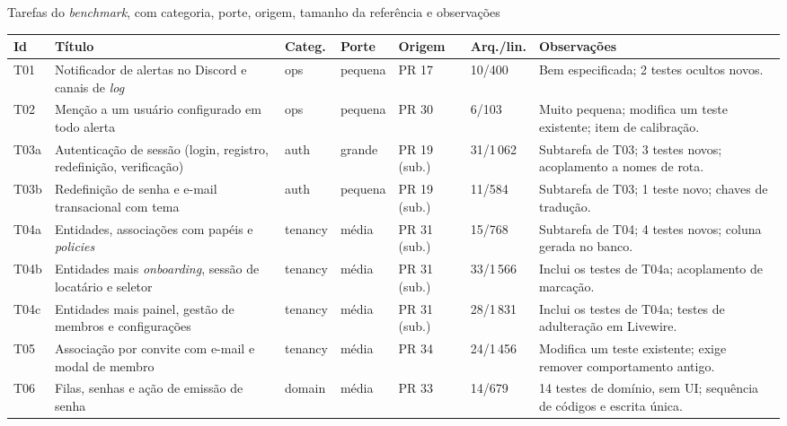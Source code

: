 \begin{quadro}[!htb]
    \centering
    \ABNTEXfontereduzida
    \caption{\label{qdr:tarefas}Tarefas do \textit{benchmark}, com categoria, porte, origem, tamanho da referência e observações}
    \begin{tabular}{|p{0.8cm}|p{3.6cm}|p{1.1cm}|p{1.2cm}|p{1.3cm}|p{1.3cm}|p{3.6cm}|}
        \hline
        \textbf{Id} & \textbf{Título} & \textbf{Categ.} & \textbf{Porte} & \textbf{Origem} & \textbf{Arq./lin.} & \textbf{Observações} \\
        \hline
        T01 & Notificador de alertas no Discord e canais de \textit{log} & ops & pequena & PR 17 & 10/400 & Bem especificada; 2 testes ocultos novos. \\
        \hline
        T02 & Menção a um usuário configurado em todo alerta & ops & pequena & PR 30 & 6/103 & Muito pequena; modifica um teste existente; item de calibração. \\
        \hline
        T03a & Autenticação de sessão (login, registro, redefinição, verificação) & auth & grande & PR 19 (sub.) & 31/1\,062 & Subtarefa de T03; 3 testes novos; acoplamento a nomes de rota. \\
        \hline
        T03b & Redefinição de senha e e-mail transacional com tema & auth & pequena & PR 19 (sub.) & 11/584 & Subtarefa de T03; 1 teste novo; chaves de tradução. \\
        \hline
        T04a & Entidades, associações com papéis e \textit{policies} & tenancy & média & PR 31 (sub.) & 15/768 & Subtarefa de T04; 4 testes novos; coluna gerada no banco. \\
        \hline
        T04b & Entidades mais \textit{onboarding}, sessão de locatário e seletor & tenancy & média & PR 31 (sub.) & 33/1\,566 & Inclui os testes de T04a; acoplamento de marcação. \\
        \hline
        T04c & Entidades mais painel, gestão de membros e configurações & tenancy & média & PR 31 (sub.) & 28/1\,831 & Inclui os testes de T04a; testes de adulteração em Livewire. \\
        \hline
        T05 & Associação por convite com e-mail e modal de membro & tenancy & média & PR 34 & 24/1\,456 & Modifica um teste existente; exige remover comportamento antigo. \\
        \hline
        T06 & Filas, senhas e ação de emissão de senha & domain & média & PR 33 & 14/679 & 14 testes de domínio, sem UI; sequência de códigos e escrita única. \\
        \hline

\end{tabular}
\end{quadro}
